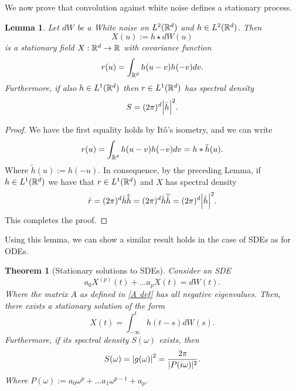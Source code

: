 \documentclass[12pt]{article}
\newtheorem{theorem}{Theorem}
\newtheorem{lemma}{Lemma}
\begin{document}
We now prove that convolution against white noise defines a stationary process.
\begin{lemma}
	Let $dW$ be a White noise on $L^2({\mathbb R}^d)$ and $h\in L^2({\mathbb R}^d)$. Then $$X(u):=h\star dW(u)$$  is a  stationary field $X:{\mathbb R}^d\to{\mathbb R}$ with covariance function
	\begin{equation*}
		r(u)=\int_{{\mathbb R}^d} h(u-v)h(-v)dv.
	\end{equation*}
	Furthermore, if also $h\in L^1({\mathbb R}^d)$ then $r\in L^1({\mathbb R}^d)$ has spectral density
	\begin{equation*}        S=(2\pi)^d{\abs{\hat{h}}^2}.
	\end{equation*}
\end{lemma}


\begin{proof}
	We have the first equality holds by Itô's isometry, and we can write
	\begin{equation*}
		r(u)=\int_{{\mathbb R}^d} h(u-v)h(-v)dv=h* \tilde{h}(u).
	\end{equation*}
	Where $\tilde{h}(u):=h(-u)$. In consequence, by the preceding Lemma, if $h\in L^1({\mathbb R}^d)$ we have that $r\in L^1({\mathbb R}^d)$ and $X$ has spectral density
	\begin{equation*}    \hat{r}=(2\pi)^d\hat{h}\hat{\tilde{h}}=(2\pi)^d\hat{h}\overline{\hat{h}}=(2\pi)^d\abs{\hat{h}}^2.
	\end{equation*}
	This completes the proof.
\end{proof}
Using this lemma, we can show a similar result holds in the case of SDEs as for ODEs.
\begin{theorem}[Stationary solutions to SDEs]
	Consider an SDE     \begin{equation*}
		a_0X^{(p)}(t)+\ldots a_pX(t)=dW(t).
	\end{equation*}
	Where the matrix $A$ as defined in  \eqref{A def} has all negative eigenvalues. Then, there exists a stationary solution of the form $$X(t)=\int_{-\infty}^t h(t-s) dW(s).$$ Furthermore, if its spectral density $S(\omega)$ exists, then    \begin{equation*}
		S(\omega)={\abs{g(\omega)}^2}=\frac{2\pi}{|P(i\omega)|^2}.
	\end{equation*}
	Where $P(\omega):=a_0\omega^p+\ldots a_{1}\omega^{p-1}+a_p$.
\end{theorem}
\end{document}
